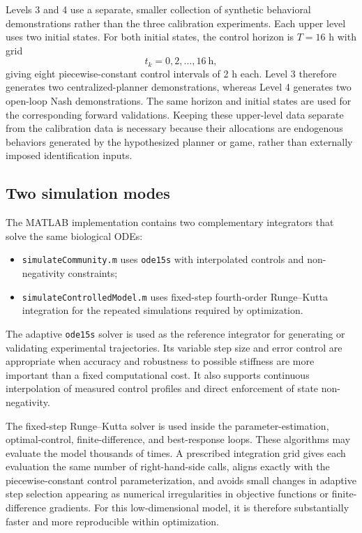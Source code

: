 \documentclass[11pt,a4paper]{article}
\begin{document}
Levels 3 and 4 use a separate, smaller collection of synthetic behavioral
demonstrations rather than the three calibration experiments. Each upper
level uses two initial states. For both initial states, the control horizon is
\(T=16\) h with grid
\[
  t_k=0,2,\ldots,16\ \text{h},
\]
giving eight piecewise-constant control intervals of 2 h each. Level 3
therefore generates two centralized-planner demonstrations, whereas Level 4
generates two open-loop Nash demonstrations. The same horizon and initial
states are used for the corresponding forward validations. Keeping these
upper-level data separate from the calibration data is necessary because
their allocations are endogenous behaviors generated by the hypothesized
planner or game, rather than externally imposed identification inputs.

\subsection{Two simulation modes}

The MATLAB implementation contains two complementary integrators that solve
the same biological ODEs:
\begin{itemize}
  \item \texttt{simulateCommunity.m} uses \texttt{ode15s} with interpolated
        controls and non-negativity constraints;
  \item \texttt{simulateControlledModel.m} uses fixed-step fourth-order
        Runge--Kutta integration for the repeated simulations required by
        optimization.
\end{itemize}

The adaptive \texttt{ode15s} solver is used as the reference integrator for
generating or validating experimental trajectories. Its variable step size
and error control are appropriate when accuracy and robustness to possible
stiffness are more important than a fixed computational cost. It also supports
continuous interpolation of measured control profiles and direct enforcement
of state non-negativity.

The fixed-step Runge--Kutta solver is used inside the parameter-estimation,
optimal-control, finite-difference, and best-response loops. These algorithms
may evaluate the model thousands of times. A prescribed integration grid gives
each evaluation the same number of right-hand-side calls, aligns exactly with
the piecewise-constant control parameterization, and avoids small changes in
adaptive step selection appearing as numerical irregularities in objective
functions or finite-difference gradients. For this low-dimensional model, it
is therefore substantially faster and more reproducible within optimization.
\end{document}
